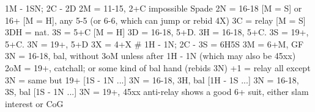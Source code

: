 1M - 1SN; 2C - 2D
2M = 11-15, 2+C
    impossible Spade
2N = 16-18 [M = S] or 16+ [M = H], any 5-5 (or 6-6, which can jump or rebid 4X)
    3C = relay
        [M = S] 3DH = nat. 3S = 5+C
        [M = H] 3D = 16-18, 5+D. 3H = 16-18, 5+C. 3S = 19+, 5+C. 3N = 19+, 5+D
3X = 4+X  # 1H - 1N; 2C - 3S = 6H5S
3M = 6+M, GF 
3N = 16-18, bal, without 3oM unless after 1H - 1N (which may also be 45xx)
2oM = 19+, catchall; or some kind of bal hand (rebids 3N)
    +1 = relay
        all except 3N = same but 19+
        [1S - 1N ...] 3N = 16-18, 3H, bal
        [1H - 1S ...] 3N = 16-18, 3S, bal
        [1S - 1N ...] 3N = 19+, 45xx
anti-relay shows a good 6+ suit, either slam interest or CoG